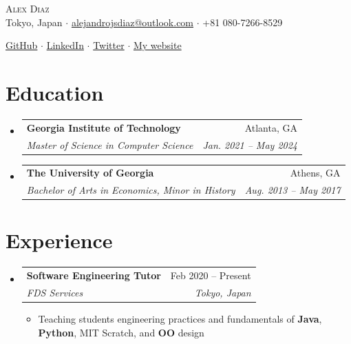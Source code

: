 \documentclass[12pt, letterpaper]{article}
\makeatletter
\newcommand{\resumeItem}[1]{
  \item\small{
    {#1 \vspace{-2pt}}
  }
}
\newcommand{\resumeSubheading}[4]{
  \vspace{-2pt}\item
    \begin{tabular*}{0.97\textwidth}[t]{l@{\extracolsep{\fill}}r}
      \textbf{#1} & #2 \\
      \textit{\small#3} & \textit{\small #4} \\
    \end{tabular*}\vspace{-7pt}
}
\newcommand{\resumeSubHeadingListStart}{\begin{itemize}[leftmargin=0.15in, label={}]}
\newcommand{\resumeSubHeadingListEnd}{\end{itemize}}
\newcommand{\resumeItemListStart}{\begin{itemize}} %
\newcommand{\resumeItemListEnd}{\end{itemize}\vspace{-16pt}}
\makeatother
\begin{document}
\vspace*{-12pt}
\begin{center}
	{\Huge \scshape {Alex Diaz}}\\
	\vspace{1mm}
	\faMapMarker \hspace{.5mm} Tokyo, Japan $\cdot$ 
	\faEnvelope \hspace{.5mm} \href{mailto:alejandrojsdiaz@outlook.com}{alejandrojsdiaz@outlook.com} $\cdot$ \faMobile \hspace{.5mm} +81 080-7266-8529
		
	\faGithub \hspace{.5mm} \href{https://github.com/calmcoconut}{GitHub} $\cdot$
	\faLinkedin \hspace{.5mm} \href{https://www.linkedin.com/in/diazjalejandro/}{LinkedIn} $\cdot$
	\faTwitter \hspace{.5mm} \href{https://twitter.com/greetingsfriend}{Twitter} $\cdot$
    \faBriefcase \hspace{.5mm} \href{https://calmcoconut.github.io/diasDiaz/}{My website}
    \\
\end{center}


\section{Education}
  \resumeSubHeadingListStart
    \resumeSubheading
      {Georgia Institute of Technology}{Atlanta, GA}
      {Master of Science in Computer Science}{Jan. 2021 -- May 2024}
    \resumeSubheading
      {The University of Georgia}{Athens, GA}
      {Bachelor of Arts in Economics, Minor in History}{Aug. 2013 -- May 2017}
 \resumeSubHeadingListEnd

\section{Experience}

\resumeSubHeadingListStart
  \resumeSubheading
    {Software Engineering Tutor}{Feb 2020 -- Present}
    {FDS Services}{Tokyo, Japan}
    \resumeItemListStart
      \resumeItem{Teaching students engineering practices and fundamentals of \textbf{Java}, \textbf{Python}, MIT Scratch, and \textbf{OO} design}
    \resumeItemListEnd
    \resumeSubHeadingListEnd
\end{document}
